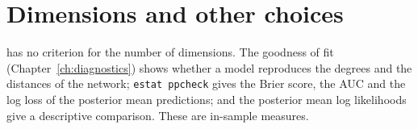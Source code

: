\section{Dimensions and other choices}

\nwlsm{} has no criterion for the number of dimensions. The goodness of fit (Chapter~\ref{ch:diagnostics}) shows whether a model reproduces the degrees and the distances of the network; \texttt{estat ppcheck} gives the Brier score, the AUC and the log loss of the posterior mean predictions; and the posterior mean log likelihoods give a descriptive comparison. These are in-sample measures.
